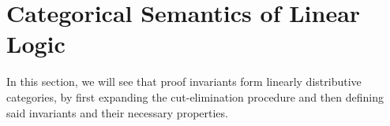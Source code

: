\documentclass[DIN, pagenumber=false, fontsize=11pt, parskip=half, colorinlistoftodos, svgnames]{scrartcl}
\begin{document}
	
	\section{Categorical Semantics of Linear Logic}
	\label{sec: CatSem}
	
	In this section, we will see that proof invariants form linearly distributive categories, by first expanding the cut-elimination procedure and then defining said invariants and their necessary properties. 
	
	
	
		
\end{document}
